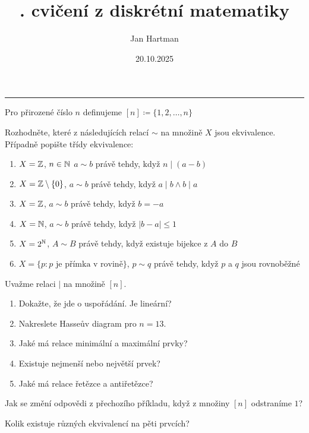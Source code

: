 \documentclass[10pt]{article}
\title{\tutnum. cvičení z diskrétní matematiky}
\author{Jan Hartman}
\date{20.10.2025}
\newcommand{\titlerule}{%
    \noindent %
    \makebox[\textwidth]{\large \thetitle \hfill \thedate}
    \rule{\textwidth}{0.4pt}%
}
\begin{document}
\titlerule

\begin{defn}
Pro přirozené číslo $n$ definujeme $[n] \coloneq \{1,2,\ldots,n\}$
\end{defn}

\begin{problem}
Rozhodněte, které z následujících relací $\sim$ na množině $X$ jsou ekvivalence. Případně popište třídy ekvivalence:
\begin{enumerate}[label=(\alph*)]
    \item $X = \mathbb{Z}$, $n \in \mathbb{N}$ $a \sim b$ právě tehdy, když $n \mid (a-b)$
    \item $X = \mathbb{Z} \setminus \{0\}$, $a \sim b$ právě tehdy, když $a \mid b \land b \mid a$
    \item $X = \mathbb{Z}$, $a \sim b$ právě tehdy, když $b = -a$
    \item $X = \mathbb{N}$, $a \sim b$ právě tehdy, když $|b-a| \leq 1$
    \item $X = 2^{\mathbb{N}}$, $A \sim B$ právě tehdy, když existuje bijekce z $A$ do $B$
    \item $X = \{ p : p \text{ je přímka v rovině} \}$, $p \sim q$ právě tehdy, když $p$ a $q$ jsou rovnoběžné
\end{enumerate}
\end{problem}

\begin{problem}[Dělitelnost]
Uvažme relaci $\mid$ na množině $[n]$.
\begin{enumerate}[label=(\alph*)]
    \item Dokažte, že jde o uspořádání. Je lineární?
    \item Nakreslete Hasseův diagram pro $n=13$.
    \item Jaké má relace minimální a maximální prvky?
    \item Existuje nejmenší nebo největší prvek?
    \item Jaké má relace řetězce a antiřetězce?
\end{enumerate}
\end{problem}

\begin{problem}
Jak se změní odpovědi z přechozího příkladu, když z množiny $[n]$ odstraníme $1$?
\end{problem}

\begin{problem}
Kolik existuje různých ekvivalencí na pěti prvcích?
\end{problem}
\end{document}
